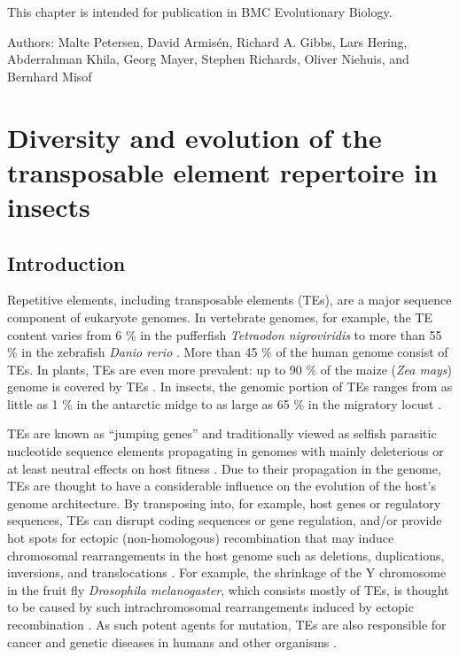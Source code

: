 \begin{savequote}[75mm]
This chapter is intended for publication in BMC Evolutionary Biology.

Authors: Malte Petersen, David Armisén, Richard A. Gibbs, Lars Hering,
Abderrahman Khila, Georg Mayer, Stephen Richards, Oliver Niehuis, and
Bernhard Misof
\end{savequote}

\chapter{Diversity and evolution of the transposable element
repertoire in insects}
\label{cha:mobilome}

\section{Introduction}\label{introduction}

Repetitive elements, including transposable elements (TEs), are a major
sequence component of eukaryote genomes. In vertebrate genomes, for
example, the TE content varies from 6 \% in the pufferfish
\emph{Tetraodon nigroviridis} to more than 55 \% in the zebrafish
\emph{Danio rerio} \citep{Chalopin2015}. More than 45 \% of the human
genome \citep{deKoning2011} consist of TEs. In plants, TEs are even more
prevalent: up to 90 \% of the maize (\emph{Zea mays}) genome is covered
by TEs \citep{SanMiguel1996}. In insects, the genomic portion of TEs ranges
from as little as 1 \% in the antarctic midge \citep{Kelley2014} to as
large as 65 \% in the migratory locust \citep{Wang2014}.

TEs are known as ``jumping genes'' and traditionally viewed as selfish
parasitic nucleotide sequence elements propagating in genomes with
mainly deleterious or at least neutral effects on host fitness
\citep{Mackay_1989}. Due to their propagation in the genome, TEs are
thought to have a considerable influence on the evolution of the host's
genome architecture. By transposing into, for example, host genes or
regulatory sequences, TEs can disrupt coding sequences or gene
regulation, and/or provide hot spots for ectopic (non-homologous)
recombination that may induce chromosomal rearrangements in the host
genome such as deletions, duplications, inversions, and translocations
\citep{Burns2012}. For example, the shrinkage of the Y chromosome in the
fruit fly \emph{Drosophila melanogaster}, which consists mostly of TEs,
is thought to be caused by such intrachromosomal rearrangements induced
by ectopic recombination \citep{Adams2000}. As such potent agents for
mutation, TEs are also responsible for cancer and genetic diseases in
humans and other organisms
\citep{Vorechovsky2009,Chenais2015,Hancks2016}.

